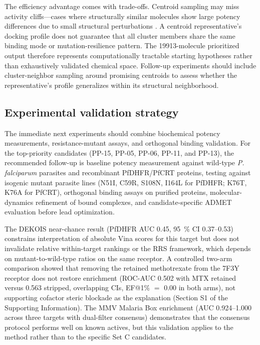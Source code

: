 \documentclass[11pt,a4paper]{article}
\begin{document}
	The efficiency advantage comes with trade-offs. Centroid sampling may miss activity cliffs—cases where structurally similar molecules show large potency differences due to small structural perturbations \cite{Stumpfe2012}. A centroid representative's docking profile does not guarantee that all cluster members share the same binding mode or mutation-resilience pattern. The \num{19913}-molecule prioritized output therefore represents computationally tractable starting hypotheses rather than exhaustively validated chemical space. Follow-up experiments should include cluster-neighbor sampling around promising centroids to assess whether the representative's profile generalizes within its structural neighborhood.
	
	\subsection{Experimental validation strategy}\label{sec:disc_validation}
	The immediate next experiments should combine biochemical potency measurements, resistance-mutant assays, and orthogonal binding validation. For the top-priority candidates (PP-15, PP-05, PP-06, PP-11, and PP-13), the recommended follow-up is baseline potency measurement against wild-type \emph{P. falciparum} parasites and recombinant PfDHFR/PfCRT proteins, testing against isogenic mutant parasite lines (N51I, C59R, S108N, I164L for PfDHFR; K76T, K76A for PfCRT), orthogonal binding assays on purified proteins, molecular-dynamics refinement of bound complexes, and candidate-specific ADMET evaluation before lead optimization.
	
	The DEKOIS near-chance result (PfDHFR AUC \num{0.45}, \qty{95}{\percent} CI \numrange{0.37}{0.53}) constrains interpretation of absolute Vina scores for this target but does not invalidate relative within-target rankings or the RRS framework, which depends on mutant-to-wild-type ratios on the same receptor. A controlled two-arm comparison showed that removing the retained methotrexate from the 7F3Y receptor does not restore enrichment (ROC-AUC \num{0.502} with MTX retained versus \num{0.563} stripped, overlapping CIs, EF@1\% $=$ \num{0.00} in both arms), not supporting cofactor steric blockade as the explanation (Section S1 of the Supporting Information). The MMV Malaria Box enrichment (AUC \numrange{0.924}{1.000} across three targets with dual-filter consensus) demonstrates that the consensus protocol performs well on known actives, but this validation applies to the method rather than to the specific Set C candidates.
	
\end{document}
